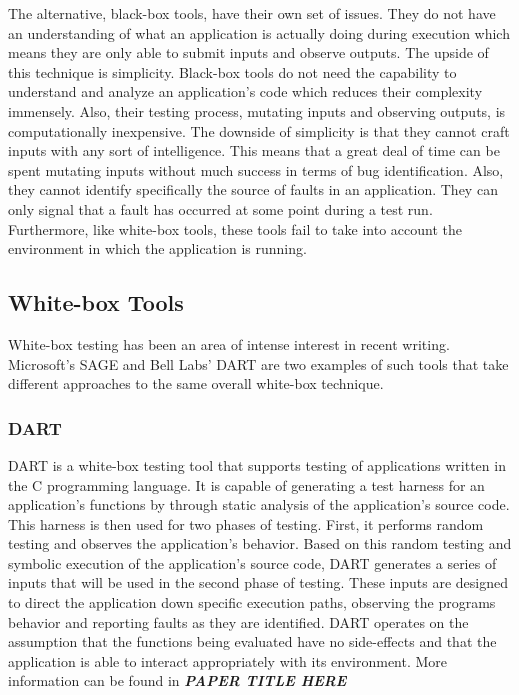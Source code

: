     The alternative, black-box tools, have their own set of issues. They do not have an understanding of what an
    application is actually doing during execution which means they are only able to submit inputs and observe
    outputs.  The upside of this technique is simplicity. Black-box tools do not need the capability to understand
    and analyze an application's code which reduces their complexity immensely. Also, their testing process,
    mutating inputs and observing outputs, is computationally inexpensive. The downside of simplicity is that they
    cannot craft inputs with any sort of intelligence. This means that a great deal of time can be spent mutating
    inputs without much success in terms of bug identification. Also, they cannot identify specifically the source
    of faults in an application. They can only signal that a fault has occurred at some point during a test run.
    Furthermore, like white-box tools, these tools fail to take into account the environment in which the
    application is running.
    \subsection{White-box Tools}

        White-box testing has been an area of intense interest in recent writing. Microsoft's SAGE and Bell Labs' DART
        are two examples of such tools that take different approaches to the same overall white-box technique.

        \subsubsection{DART}

            DART is a white-box testing tool that supports testing of applications written in the C programming language. It
            is capable of generating a test harness for an application's functions by through static analysis of the
            application's source code. This harness is then used for two phases of testing. First, it performs random
            testing and observes the application's behavior. Based on this random testing and symbolic execution of the
            application's source code, DART generates a series of inputs that will be used in the second phase of testing.
            These inputs are designed to direct the application down specific execution paths, observing the programs
            behavior and reporting faults as they are identified. DART operates on the assumption that the functions being
            evaluated have no side-effects and that the application is able to interact appropriately with its environment.
            More information can be found in \textbf{\emph{PAPER TITLE HERE}}

